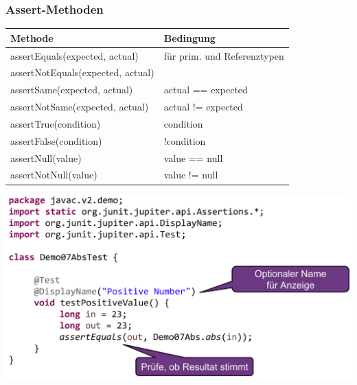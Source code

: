 \subsubsection{Assert-Methoden}
\begin{center}
    \begin{tabular}{ll}
        \rowcolor[RGB]{239,239,239} 
        \textbf{Methode} & \textbf{Bedingung} \\ \hline
        assertEquals(expected, actual) & für prim. und Referenztypen \\
        assertNotEquals(expected, actual) & \\
        assertSame(expected, actual) & actual == expected\\
        assertNotSame(expected, actual) & actual != expected\\
        assertTrue(condition) & condition\\
        assertFalse(condition) & !condition\\
        assertNull(value) & value == null\\
        assertNotNull(value) & value != null\\
    \end{tabular}
\end{center}

\begin{center}
    \includegraphics[width=0.9\columnwidth]{pictures/testmethode.png}    
\end{center}



